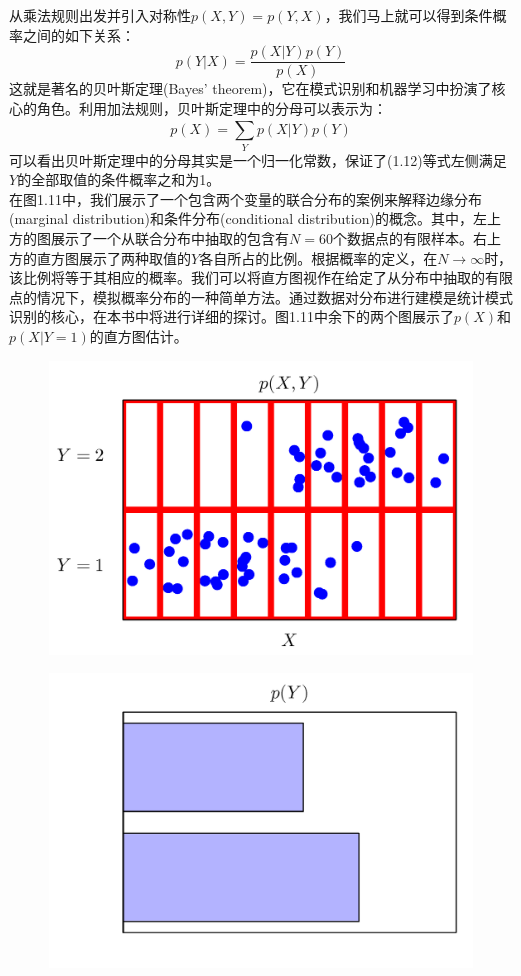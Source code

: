 \documentclass[b5paper]{book}
\numberwithin{equation}{chapter}
\begin{document}
{	\indent 从乘法规则出发并引入对称性$p(X,Y)=p(Y,X)$，我们马上就可以得到条件概率之间的如下关系：
	\begin{equation}
		p(Y|X)=\frac{p(X|Y)p(Y)}{p(X)}
	\end{equation}
	\indent 这就是著名的贝叶斯定理(Bayes' theorem)，它在模式识别和机器学习中扮演了核心的角色。利用加法规则，贝叶斯定理中的分母可以表示为：
	\begin{equation}
		p(X)=\sum_{Y}^{} p(X|Y)p(Y)
	\end{equation}
	\indent 可以看出贝叶斯定理中的分母其实是一个归一化常数，保证了(1.12)等式左侧满足$Y$的全部取值的条件概率之和为1。\\
	\indent 在图1.11中，我们展示了一个包含两个变量的联合分布的案例来解释边缘分布(marginal distribution)和条件分布(conditional distribution)的概念。其中，左上方的图展示了一个从联合分布中抽取的包含有$N=60$个数据点的有限样本。右上方的直方图展示了两种取值的$Y$各自所占的比例。根据概率的定义，在$N\rightarrow　\infty$时，该比例将等于其相应的概率。我们可以将直方图视作在给定了从分布中抽取的有限点的情况下，模拟概率分布的一种简单方法。通过数据对分布进行建模是统计模式识别的核心，在本书中将进行详细的探讨。图1.11中余下的两个图展示了$p(X)$和$p(X|Y=1)$的直方图估计。
	\begin{figure}[ht]
		\begin{minipage}[t]{0.5\linewidth}
		\includegraphics[scale=0.8]{Images/1-11a.png}
		\label{fig:1-11a}
		\end{minipage}
		\begin{minipage}[t]{0.5\linewidth}
		\includegraphics[scale=0.8]{Images/1-11b.png}

\end{minipage}
\end{figure}}
\end{document}
